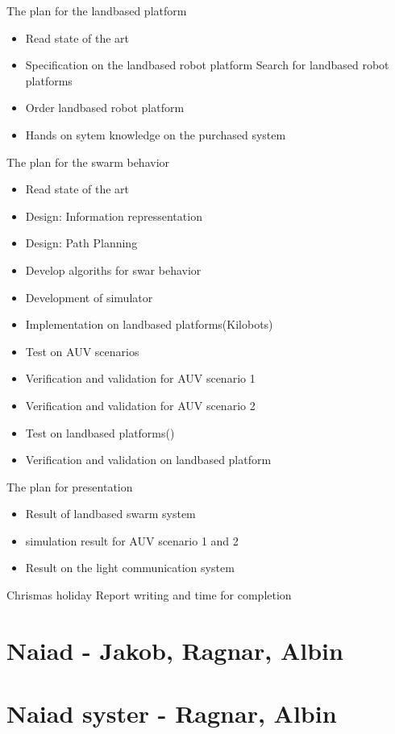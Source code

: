 \documentclass[a4paper, 10pt]{article} %
\begin{document}
The plan for the landbased platform
\begin{itemize}
\item Read state of the art
\item Specification on the landbased robot platform
\Item Search for landbased robot platforms
\item Order landbased robot platform
\item Hands on sytem knowledge on the purchased system
\end{itemize}

The plan for the swarm behavior
\begin{itemize}
\item Read state of the art
\item Design: Information repressentation
\item Design: Path Planning
\item Develop algoriths for swar behavior
\item Development of simulator
\item Implementation on landbased platforms(Kilobots)
\item Test on AUV scenarios
\item Verification and validation for AUV scenario 1
\item Verification and validation for AUV scenario 2
\item Test on landbased platforms()
\item Verification and validation on landbased platform
\end{itemize}

The plan for presentation
\begin{itemize}
\item Result of landbased swarm system
\item simulation result for AUV scenario 1 and 2
\item Result on the light communication system
\end{itemize}

Chrismas holiday
Report writing and time for completion



\section{Naiad - Jakob, Ragnar, Albin}
\section{Naiad syster - Ragnar, Albin}
\end{document}
